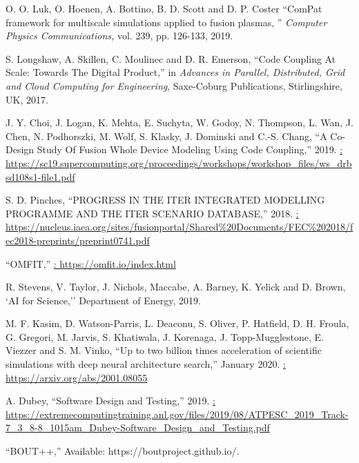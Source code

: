 \documentclass{article}
\begin{document}
\begin{thebibliography}{1}
O. O. Luk, O. Hoenen, A. Bottino, B. D. Scott and D. P. Coster
``ComPat framework for multiscale simulations applied to fusion plasmas, ''
\textit{Computer Physics Communications, }vol. 239, pp. 126-133, 2019. 

S. Longshaw, A. Skillen, C. Moulinec and D. R. Emerson,
``Code Coupling At Scale: Towards The Digital Product,''
in \textit{Advances in Parallel, Distributed, Grid and Cloud Computing for Engineering}, Saxe-Coburg Publications, Stirlingshire, UK, 2017. 

 J. Y. Choi, J. Logan, K. Mehta, E. Suchyta, W. Godoy, N. Thompson, L. Wan, 
J. Chen, N. Podhorszki, M. Wolf, S. Klasky, J. Dominski and C.-S. Chang,
``A Co-Design Study Of Fusion Whole Device Modeling Using Code Coupling,'' 2019. 
\newblock \url{: https://sc19.supercomputing.org/proceedings/workshops/workshop\_files/ws\_drbsd108s1-file1.pdf}

 S. D. Pinches,
``PROGRESS IN THE ITER INTEGRATED MODELLING PROGRAMME AND THE ITER SCENARIO DATABASE,'' 2018. 
\newblock \url{: https://nucleus.iaea.org/sites/fusionportal/Shared\%20Documents/FEC\%202018/fec2018-preprints/preprint0741.pdf}

``OMFIT,''
\newblock \url{: https://omfit.io/index.html}

R. Stevens, V. Taylor, J. Nichols, Maccabe, A. Barney, K. Yelick and D.  Brown, 
`AI for Science,''
Department of Energy, 2019.

 M. F. Kasim, D. Watson-Parris, L. Deaconu, S. Oliver, P. Hatfield, D. H. 
Froula, G. Gregori, M. Jarvis, S. Khatiwala, J. Korenaga, J. Topp-Mugglestone, 
E. Viezzer and S. M. Vinko,
``Up to two billion times acceleration of scientific simulations with deep neural architecture search,''
January 2020.
\newblock \url{: https://arxiv.org/abs/2001.08055}

A. Dubey,
``Software Design and Testing,'' 2019. 
\newblock \url{: https://extremecomputingtraining.anl.gov/files/2019/08/ATPESC\_2019\_Track-7\_3\_8-8\_1015am\_Dubey-Software\_Design\_and\_Testing.pdf}

``BOUT++,'' Available: https://boutproject.github.io/.


\end{thebibliography}
\end{document}
